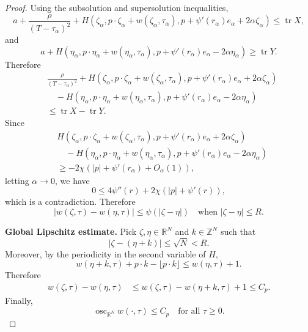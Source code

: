 \documentclass[preprint]{elsarticle}
\numberwithin{equation}{section}
\begin{document}
\begin{proof}
Using the subsolution and supersolution inequalities,
\begin{equation*}
a+\frac{\rho}{(T-\tau_\alpha)^2}
+
H\left(
\zeta_\alpha,
p\cdot\zeta_\alpha+w(\zeta_\alpha,\tau_\alpha),
p+\psi'(r_\alpha)e_\alpha+2\alpha\zeta_\alpha
\right)
\le
\operatorname{tr}X,
\end{equation*}
and
\begin{equation*}
a+
H\left(
\eta_\alpha,
p\cdot\eta_\alpha+w(\eta_\alpha,\tau_\alpha),
p+\psi'(r_\alpha)e_\alpha-2\alpha\eta_\alpha
\right)
\ge
\operatorname{tr}Y.
\end{equation*}
Therefore
\begin{align*}
&\frac{\rho}{(T-\tau_\alpha)^2}
+
H\left(
\zeta_\alpha,
p\cdot\zeta_\alpha+w(\zeta_\alpha,\tau_\alpha),
p+\psi'(r_\alpha)e_\alpha+2\alpha\zeta_\alpha
\right)
\\
&\quad
-
H\left(
\eta_\alpha,
p\cdot\eta_\alpha+w(\eta_\alpha,\tau_\alpha),
p+\psi'(r_\alpha)e_\alpha-2\alpha\eta_\alpha
\right)
\\
&\le
\operatorname{tr}X-\operatorname{tr}Y.
\end{align*}
Since
\begin{align*}
&H\left(
\zeta_\alpha,
p\cdot\zeta_\alpha+w(\zeta_\alpha,\tau_\alpha),
p+\psi'(r_\alpha)e_\alpha+2\alpha\zeta_\alpha
\right)
\\
&\quad
-
H\left(
\eta_\alpha,
p\cdot\eta_\alpha+w(\eta_\alpha,\tau_\alpha),
p+\psi'(r_\alpha)e_\alpha-2\alpha\eta_\alpha
\right)
\\
&\ge
-2\chi\left(|p|+\psi'(r_\alpha)+O_\alpha(1)\right),
\end{align*}
letting $\alpha\to0$, we have
\begin{equation*}
0\le 4\psi''(r)+2\chi(|p|+\psi'(r)),
\end{equation*}
which is a contradiction. Therefore
\begin{equation*}
|w(\zeta,\tau)-w(\eta,\tau)|
\le
\psi(|\zeta-\eta|)
\quad\text{when }|\zeta-\eta|\le R.
\end{equation*}

\medskip

\noindent\textbf{Global Lipschitz estimate.}
Pick $\zeta,\eta\in\mathbb R^N$ and $k\in\mathbb Z^N$ such that
\begin{equation*}
|\zeta-(\eta+k)|\le \sqrt N<R.
\end{equation*}
Moreover, by the periodicity in the second variable of $H$,
\begin{equation*}
w(\eta+k,\tau)+p\cdot k-\lfloor p\cdot k\rfloor
\le
w(\eta,\tau)+1.
\end{equation*}
Therefore
\begin{align*}
w(\zeta,\tau)-w(\eta,\tau)
&\le
w(\zeta,\tau)-w(\eta+k,\tau)+1 \le
C_p.
\end{align*}
Finally,
\begin{equation*}
\operatorname{osc}_{\mathbb R^N}w(\cdot,\tau)\le C_p
\quad\text{for all }\tau\ge0.
\end{equation*}
\end{proof}
\end{document}

